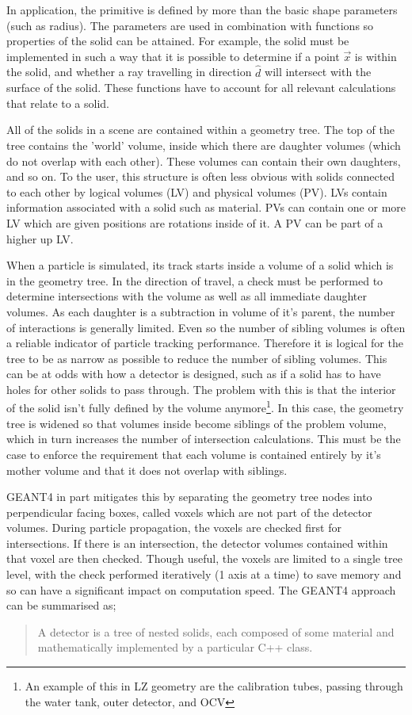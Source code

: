 \par
In application, the primitive is defined by more than the basic shape parameters (such as radius).
The parameters are used in combination with functions so properties of the solid can be attained.
For example, the solid must be implemented in such a way that it is possible to determine if a point $\vec{x}$ is within the solid, and whether a ray travelling in direction $\hat{d}$ will intersect with the surface of the solid.
These functions have to account for all relevant calculations that relate to a solid.
\par
All of the solids in a scene are contained within a geometry tree.
The top of the tree contains the 'world' volume, inside which there are daughter volumes (which do not overlap with each other).
These volumes can contain their own daughters, and so on.
To the user, this structure is often less obvious with solids connected to each other by logical volumes (LV) and physical volumes (PV).
LVs contain information associated with a solid such as material. 
PVs can contain one or more LV which are given positions are rotations inside of it. 
A PV can be part of a higher up LV.
\par
When a particle is simulated, its track starts inside a volume of a solid which is in the geometry tree.
In the direction of travel, a check must be performed to determine intersections with the volume as well as all immediate daughter volumes.
As each daughter is a subtraction in volume of it's parent, the number of interactions is generally limited.
Even so the number of sibling volumes is often a reliable indicator of particle tracking performance.
Therefore it is logical for the tree to be as narrow as possible to reduce the number of sibling volumes.
This can be at odds with how a detector is designed, such as if a solid has to have holes for other solids to pass through.
The problem with this is that the interior of the solid isn't fully defined by the volume anymore\footnote{An example of this in LZ geometry are the calibration tubes, passing through the water tank, outer detector, and OCV}.
In this case, the geometry tree is widened so that volumes inside become siblings of the problem volume, which in turn increases the number of intersection calculations.
This must be the case to enforce the requirement that each volume is contained entirely by it's mother volume and that it does not overlap with siblings.
\par
GEANT4 in part mitigates this by separating the geometry tree nodes into perpendicular facing boxes, called voxels \cite{geant4_voxel_ref} which are not part of the detector volumes.
During particle propagation, the voxels are checked first for intersections.
If there is an intersection, the detector volumes contained within that voxel are then checked.
Though useful, the voxels are limited to a single tree level, with the check performed iteratively (1 axis at a time) to save memory and so can have a significant impact on computation speed.
The GEANT4 approach can be summarised as;
\begin{quote}
    A detector is a tree of nested solids, each composed of some material and mathematically implemented by a particular C++ class.
\end{quote}

